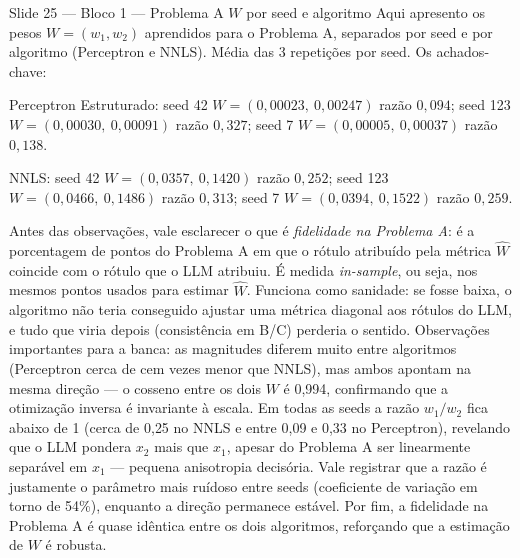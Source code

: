 \documentclass[aspectratio=169,10pt]{beamer}
\begin{document}
\begin{frame}{Slide 25 --- Bloco 1 --- Problema A $W$ por seed e algoritmo}
\footnotesize
Aqui apresento os pesos $W = (w_1, w_2)$ aprendidos para o Problema A, separados por seed e por algoritmo (Perceptron e NNLS). M\'edia das 3 repeti\c{c}\~oes por seed. Os achados-chave:

Perceptron Estruturado: seed 42 $W=(0{,}00023,\ 0{,}00247)$ raz\~ao $0{,}094$; seed 123 $W=(0{,}00030,\ 0{,}00091)$ raz\~ao $0{,}327$; seed 7 $W=(0{,}00005,\ 0{,}00037)$ raz\~ao $0{,}138$.

NNLS: seed 42 $W=(0{,}0357,\ 0{,}1420)$ raz\~ao $0{,}252$; seed 123 $W=(0{,}0466,\ 0{,}1486)$ raz\~ao $0{,}313$; seed 7 $W=(0{,}0394,\ 0{,}1522)$ raz\~ao $0{,}259$.

Antes das observa\c{c}\~oes, vale esclarecer o que \'e \emph{fidelidade na Problema A}: \'e a porcentagem de pontos do Problema A em que o r\'otulo atribu\'ido pela m\'etrica $\hat W$ coincide com o r\'otulo que o LLM atribuiu. \'E medida \emph{in-sample}, ou seja, nos mesmos pontos usados para estimar $\hat W$. Funciona como sanidade: se fosse baixa, o algoritmo n\~ao teria conseguido ajustar uma m\'etrica diagonal aos r\'otulos do LLM, e tudo que viria depois (consist\^encia em B/C) perderia o sentido. Observa\c{c}\~oes importantes para a banca: as magnitudes diferem muito entre algoritmos (Perceptron cerca de cem vezes menor que NNLS), mas ambos apontam na mesma dire\c{c}\~ao --- o cosseno entre os dois $W$ \'e 0{,}994, confirmando que a otimiza\c{c}\~ao inversa \'e invariante \`a escala. Em todas as seeds a raz\~ao $w_1/w_2$ fica abaixo de 1 (cerca de 0{,}25 no NNLS e entre 0{,}09 e 0{,}33 no Perceptron), revelando que o LLM pondera $x_2$ mais que $x_1$, apesar do Problema A ser linearmente separ\'avel em $x_1$ --- pequena anisotropia decis\'oria. Vale registrar que a raz\~ao \'e justamente o par\^ametro mais ru\'idoso entre seeds (coeficiente de varia\c{c}\~ao em torno de 54\%), enquanto a dire\c{c}\~ao permanece est\'avel. Por fim, a fidelidade na Problema A \'e quase id\^entica entre os dois algoritmos, refor\c{c}ando que a estima\c{c}\~ao de $W$ \'e robusta.
\end{frame}
\end{document}
